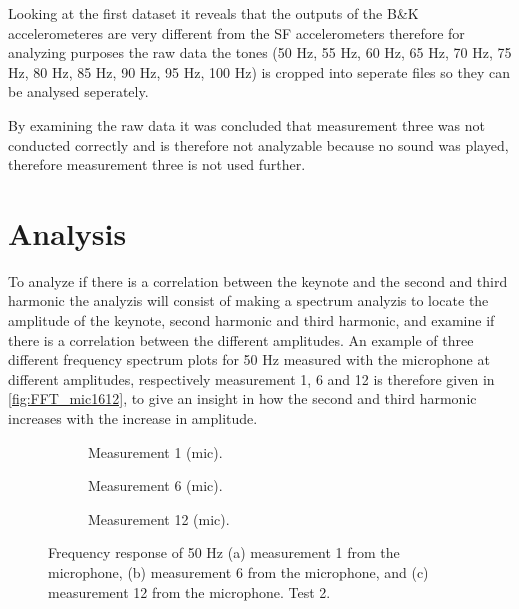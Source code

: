 Looking at the first dataset it reveals that the outputs of the B\&K accelerometeres are very different from the SF accelerometers therefore for analyzing purposes the raw data the tones (50 Hz, 55 Hz, 60 Hz, 65 Hz, 70 Hz, 75 Hz, 80 Hz, 85 Hz, 90 Hz, 95 Hz, 100 Hz) is cropped into seperate files so they can be analysed seperately.

By examining the raw data it was concluded that measurement three was not conducted correctly and is therefore not analyzable because no sound was played, therefore measurement three is not used further. 

\section{Analysis}
To analyze if there is a correlation between the keynote and the second and third harmonic the analyzis will consist of making a spectrum analyzis to locate the amplitude of the keynote, second harmonic and third harmonic, and examine if there is a correlation between the different amplitudes. An example of three different frequency spectrum plots for 50 Hz measured with the microphone at different amplitudes, respectively measurement 1, 6 and 12 is therefore given in \autoref{fig:FFT_mic1612}, to give an insight in how the second and third harmonic increases with the increase in amplitude.

\begin{figure}[H]
\centering
\begin{subfigure}[t]{0.37\textwidth}
    
    \caption{Measurement 1 (mic).}
    \label{fig:FFT_mic1_50Hz}
\end{subfigure}
\begin{subfigure}[t]{0.28\textwidth}
    
    \caption{Measurement 6 (mic).}
    \label{fig:FFT_mic6_50Hz}
\end{subfigure}
\begin{subfigure}[t]{0.32\textwidth}
    
    \caption{Measurement 12 (mic).}
    \label{fig:FFT_mic1_50Hz}
\end{subfigure}
\caption{Frequency response of 50 Hz (a) measurement 1 from the microphone, (b) measurement 6 from the microphone, and (c) measurement 12 from the microphone. Test 2.}
\label{fig:FFT_mic1612}
\end{figure}   

